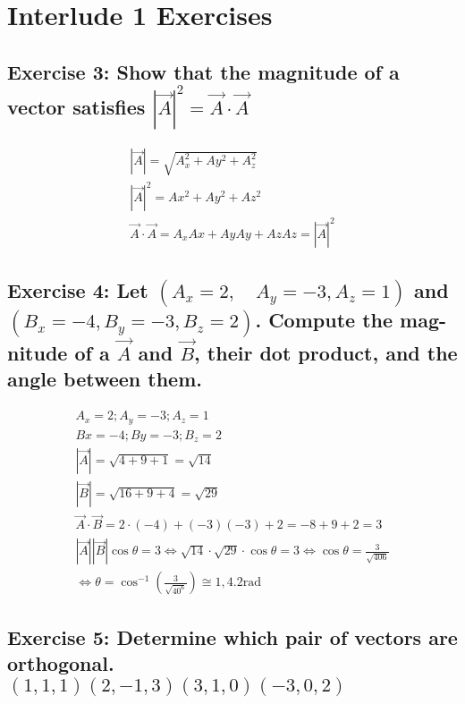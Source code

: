\documentclass[../main.tex]{subfiles}
\begin{document}
\section{Interlude 1 Exercises}

\subsection*{Exercise 3: Show that the magnitude of a vector satisfies
$|\vec{A}|^2=\vec{A} \cdot \vec{A}$}

\begin{equation}
\begin{array}{l}
|\vec{A}|=\sqrt{A_{x}^{2}+A y^{2}+A_{z}^{2}} \\
|\vec{A}|^{2}=A x^{2}+A y^{2}+A z^{2} \\
\vec{A} \cdot \vec{A}=A_{x} A x+A y A y+A z A z=|\vec{A}|^{2}
\end{array}
\end{equation}

\subsection*{Exercise 4: Let $\left(A_x=2, \quad A_y=-3, A_z=1\right)$ and
$\left(B_x=-4, B_y=-3, B_z=2\right)$. Compute the mag- nitude of a $\vec{A}$
and $\vec{B}$, their dot product, and the angle between them.}

\begin{equation}
\begin{array}{l}
A_{x}=2 ; A_{y}=-3 ; A_{z}=1\\
B x=-4 ; B y=-3 ; B_{z}=2\\
|\vec{A}|=\sqrt{4+9+1}=\sqrt{14}\\
|\vec{B}|=\sqrt{16+9+4}=\sqrt{29}\\
\vec{A} \cdot \vec{B}=2 \cdot(-4)+(-3)(-3)+2=-8+9+2=3\\
|\vec{A}||\vec{B}| \cos \theta=3 \Leftrightarrow \sqrt{14} \cdot \sqrt{29} \cdot \cos \theta=3 \Leftrightarrow \cos \theta=\frac{3}{\sqrt{406}}\\
\Leftrightarrow \theta=\cos ^{-1}\left(\frac{3}{\sqrt{40^{6}}}\right) \cong 1,4.2 \mathrm{rad}
\end{array}
\end{equation}

\subsection*{Exercise 5: Determine which pair of vectors are orthogonal.
$(1,1,1)(2,-1,3)(3,1,0)(-3,0,2)$}
\end{document}
